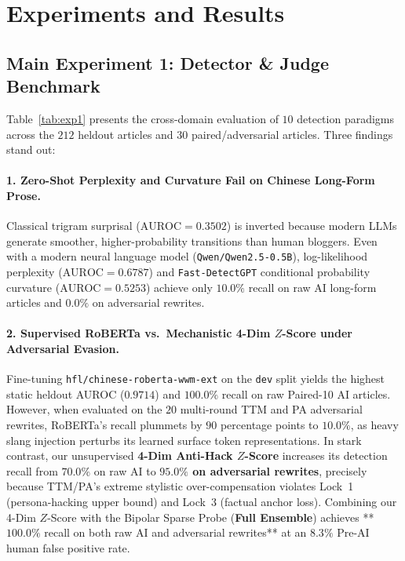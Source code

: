 \documentclass[11pt]{article}
\begin{document}
\section{Experiments and Results}
\label{sec:experiments}

\subsection{Main Experiment 1: Detector \& Judge Benchmark}
Table~\ref{tab:exp1} presents the cross-domain evaluation of $10$ detection paradigms across the $212$ heldout articles and $30$ paired/adversarial articles. Three findings stand out:

\paragraph{1. Zero-Shot Perplexity and Curvature Fail on Chinese Long-Form Prose.}
Classical trigram surprisal ($\text{AUROC} = 0.3502$) is inverted because modern LLMs generate smoother, higher-probability transitions than human bloggers. Even with a modern neural language model (\texttt{Qwen/Qwen2.5-0.5B}), log-likelihood perplexity ($\text{AUROC} = 0.6787$) and \texttt{Fast-DetectGPT} conditional probability curvature ($\text{AUROC} = 0.5253$) achieve only $10.0\%$ recall on raw AI long-form articles and $0.0\%$ on adversarial rewrites.

\paragraph{2. Supervised RoBERTa vs.\ Mechanistic 4-Dim $Z$-Score under Adversarial Evasion.}
Fine-tuning \texttt{hfl/chinese-roberta-wwm-ext} on the \texttt{dev} split yields the highest static heldout AUROC ($0.9714$) and $100.0\%$ recall on raw Paired-10 AI articles. However, when evaluated on the $20$ multi-round TTM and PA adversarial rewrites, RoBERTa's recall plummets by $90$ percentage points to \textbf{$10.0\%$}, as heavy slang injection perturbs its learned surface token representations. In stark contrast, our unsupervised \textbf{4-Dim Anti-Hack $Z$-Score} increases its detection recall from $70.0\%$ on raw AI to \textbf{$95.0\%$ on adversarial rewrites}, precisely because TTM/PA's extreme stylistic over-compensation violates Lock~1 (persona-hacking upper bound) and Lock~3 (factual anchor loss). Combining our 4-Dim $Z$-Score with the Bipolar Sparse Probe (\textbf{Full Ensemble}) achieves **$100.0\%$ recall on both raw AI and adversarial rewrites** at an $8.3\%$ Pre-AI human false positive rate.
\end{document}
